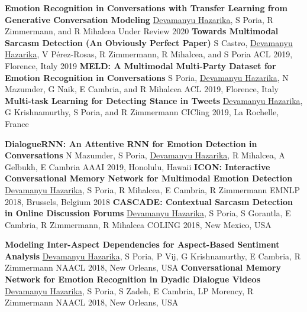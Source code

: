 \begin{cvpublications}

  \cvpublication
    {\textbf{Emotion Recognition in Conversations with Transfer Learning from Generative Conversation Modeling}}  %
    {\underline{Devamanyu Hazarika}, S Poria, R Zimmermann, and R Mihalcea} %
    {Under Review} %
    {2020} %
  \cvpublication
    {\textbf{Towards Multimodal Sarcasm Detection (An Obviously Perfect Paper)}}  %
    {S Castro, \underline{Devamanyu Hazarika}, V Pérez-Rosas, R Zimmermann, R Mihalcea, and S Poria} %
    {ACL 2019, Florence, Italy} %
    {2019} %
  \cvpublication
    {\textbf{MELD: A Multimodal Multi-Party Dataset for Emotion Recognition in Conversations}}  %
    {S Poria, \underline{Devamanyu Hazarika}, N Mazumder, G Naik, E Cambria, and R Mihalcea} %
    {ACL 2019, Florence, Italy} %
    {} %
  \cvpublication
    {\textbf{Multi-task Learning for Detecting Stance in Tweets}}  %
    {\underline{Devamanyu Hazarika}, G Krishnamurthy, S Poria, and R Zimmermann} %
    {CICling 2019, La Rochelle, France} %
    {} %

  \cvpublication
    {\textbf{DialogueRNN: An Attentive RNN for Emotion Detection in Conversations}}  %
    {N Mazumder, S Poria, \underline{Devamanyu Hazarika}, R Mihalcea, A Gelbukh, E Cambria} %
    {AAAI 2019, Honolulu, Hawaii} %
    {} %
  \cvpublication
    {\textbf{ICON: Interactive Conversational Memory Network for Multimodal Emotion Detection}}  %
    {\underline{Devamanyu Hazarika}, S Poria, R Mihalcea, E Cambria, R Zimmermann} %
    {EMNLP 2018, Brussels, Belgium} %
    {2018} %
  \cvpublication
    {\textbf{CASCADE: Contextual Sarcasm Detection in Online Discussion Forums}} %
    {\underline{Devamanyu Hazarika}, S Poria, S Gorantla, E Cambria, R Zimmermann, R Mihalcea} %
    {COLING 2018, New Mexico, USA} %
    {} %


  \cvpublication
    {\textbf{Modeling Inter-Aspect Dependencies for Aspect-Based Sentiment Analysis}} %
    {\underline{Devamanyu Hazarika}, S Poria, P Vij, G Krishnamurthy,  E Cambria, R Zimmermann} %
    {NAACL 2018, New Orleans, USA} %
    {} %
  \cvpublication
    {\textbf{Conversational Memory Network for Emotion Recognition in Dyadic Dialogue Videos}} %
    {\underline{Devamanyu Hazarika}, S Poria, S Zadeh, E Cambria, LP Morency, R Zimmermann} %
    {NAACL 2018, New Orleans, USA} %
    {} %


\end{cvpublications}
